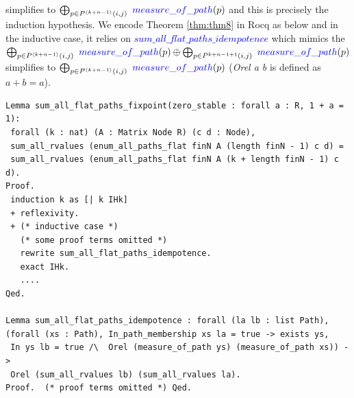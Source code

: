 \documentclass[a4paper,UKenglish,cleveref, autoref, thm-restate, anonymous]{lipics-v2021}
\begin{document}
simplifies to $\bigoplus_{p \in P^{\langle k + n - 1 \rangle}(i, j)} \ \textcolor{blue}{measure\_of\_path}(p)$ and this is precisely the induction hypothesis. 
We encode Theorem \ref{thm:thm8} in Rocq as below and in the inductive case, 
it relies on \textcolor{blue}{$sum\_all\_flat\_paths\_idempotence$} which mimics the 
$\bigoplus_{p \in P^{\langle k + n - 1 \rangle}(i, j)} \ \textcolor{blue}{measure\_of\_path}(p) \oplus \bigoplus_{p \in P^{k + n - 1 + 1}(i, j)} \ \textcolor{blue}{measure\_of\_path}(p)$
simplifies to $\bigoplus_{p \in P^{\langle k + n - 1 \rangle}(i, j)} \ \textcolor{blue}{measure\_of\_path}(p)$ (\emph{Orel a b} is defined as $a + b = a$).
\vspace{2mm}
\begin{lstlisting}[language=Coq]
Lemma sum_all_flat_paths_fixpoint(zero_stable : forall a : R, 1 + a = 1):  
 forall (k : nat) (A : Matrix Node R) (c d : Node), 
 sum_all_rvalues (enum_all_paths_flat finN A (length finN - 1) c d) =
 sum_all_rvalues (enum_all_paths_flat finN A (k + length finN - 1) c d).
Proof. 
 induction k as [| k IHk]
 + reflexivity.
 + (* inductive case *)
   (* some proof terms omitted *) 
   rewrite sum_all_flat_paths_idempotence. 
   exact IHk.
   ....
Qed.

Lemma sum_all_flat_paths_idempotence : forall (la lb : list Path), 
(forall (xs : Path), In_path_membership xs la = true -> exists ys, 
 In ys lb = true /\  Orel (measure_of_path ys) (measure_of_path xs)) ->
 Orel (sum_all_rvalues lb) (sum_all_rvalues la).           
Proof.  (* proof terms omitted *) Qed.
\end{lstlisting}
\end{document}
